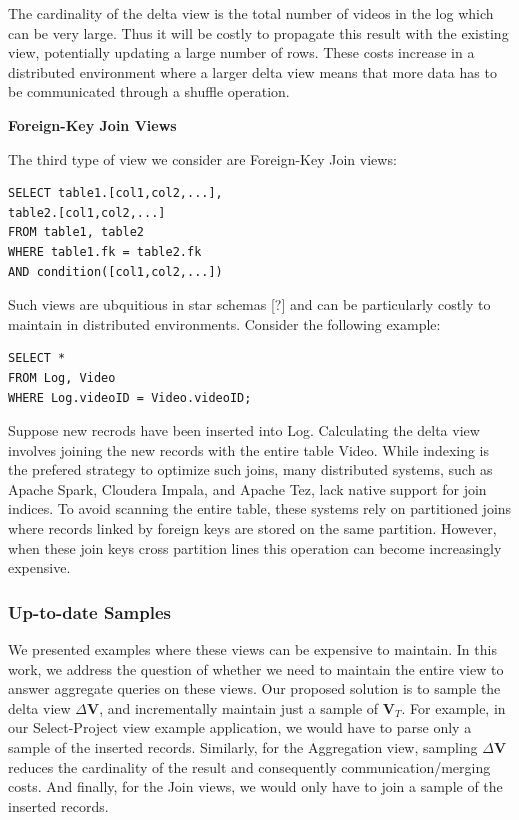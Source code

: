 The cardinality of the delta view is the total number of videos in the log which can be very large.
Thus it will be costly to propagate this result with the existing view, potentially updating a large number of rows. 
These costs increase in a distributed environment where a larger
delta view means that more data has to be communicated through a shuffle
operation. 

\vspace{1em}

\noindent\textbf{Foreign-Key Join Views}

The third type of view we consider are Foreign-Key Join views:

\begin{lstlisting}
SELECT table1.[col1,col2,...], 
table2.[col1,col2,...]
FROM table1, table2 
WHERE table1.fk = table2.fk 
AND condition([col1,col2,...]) 
\end{lstlisting}

Such views are ubquitious in star schemas {[}?{]} and can be particularly
costly to maintain in distributed environments. Consider the following example:

\begin{lstlisting}
SELECT * 
FROM Log, Video 
WHERE Log.videoID = Video.videoID;
\end{lstlisting}

Suppose new recrods have been inserted into Log. Calculating the
delta view involves joining the new records with the entire table Video.
While indexing is the prefered strategy to optimize such joins, many
distributed systems, such as Apache Spark, Cloudera Impala, and Apache
Tez, lack native support for join indices. To avoid scanning the entire
table, these systems rely on partitioned joins where records linked
by foreign keys are stored on the same partition. However, when these
join keys cross partition lines this operation can become increasingly
expensive.

\subsubsection{Up-to-date Samples}
We presented examples where these views can be expensive to maintain.
In this work, we address the question of whether we need to maintain
the entire view to answer aggregate queries on these views. Our proposed
solution is to sample the delta view $\Delta\textbf{V}$, and incrementally
maintain just a sample of $\textbf{V}_{T}$. For example, in our Select-Project
view example application, we would have to parse only a sample of
the inserted records. Similarly, for the Aggregation view, sampling
$\Delta\textbf{V}$ reduces the cardinality of the result and consequently
communication/merging costs. And finally, for the Join views, we would
only have to join a sample of the inserted records. 

